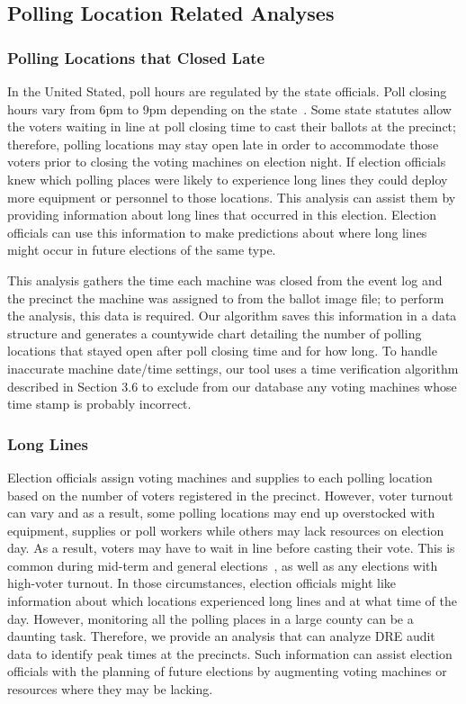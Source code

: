 \subsection{Polling Location Related Analyses}
\subsubsection{Polling Locations that Closed Late}
In the United Stated, poll hours are regulated by the state officials. Poll closing hours vary from 6pm to 9pm depending on the state~\cite{Info2007}. Some state statutes allow the voters waiting in line at poll closing time to cast their ballots at the precinct; therefore,  polling locations may stay open late in order to accommodate those voters prior to closing the voting machines on election night. If election officials knew which polling places were likely to experience long lines they could deploy more equipment or personnel to those locations. This analysis can assist them by providing information about long lines that occurred in this election. Election officials can use this information to make predictions about where long lines might occur in future elections of the same type.

This analysis gathers the time each machine was closed from the event log and the precinct the machine was assigned to from the ballot image file; to perform the analysis, this data is required.  Our algorithm saves this information in a data structure and generates a countywide chart detailing the number of polling locations that stayed open after poll closing time and for how long. To handle inaccurate machine date/time settings, our tool uses a time verification algorithm described in Section 3.6 to exclude from our database any voting machines whose time stamp is probably incorrect. 

\subsubsection{Long Lines}
Election officials assign voting machines and supplies to each polling location based on the number of voters registered in the precinct.  However, voter turnout can vary and as a result, some polling locations may end up overstocked with equipment, supplies or poll workers while others may lack resources on election day. As a result, voters may have to wait in line before casting their vote. This is common during mid-term and general elections~\cite{Kreitman2010, Slade2008, U2010}, as well as any elections with high-voter turnout.  In those circumstances, election officials might like information about which locations experienced long lines and at what time of the day. However, monitoring all the polling places in a large county can be a daunting task. Therefore, we provide an analysis that can analyze DRE audit data to identify peak times at the precincts. Such information can assist election officials with the planning of future elections by augmenting voting machines or resources where they may be lacking.

